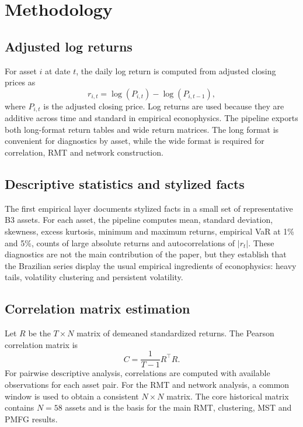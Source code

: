 \section{Methodology}
\label{sec:methodology}

\subsection{Adjusted log returns}

For asset $i$ at date $t$, the daily log return is computed from adjusted closing prices as
\begin{equation}
r_{i,t} = \log(P_{i,t}) - \log(P_{i,t-1}),
\end{equation}
where $P_{i,t}$ is the adjusted closing price. Log returns are used because they are additive across time and standard in empirical econophysics. The pipeline exports both long-format return tables and wide return matrices. The long format is convenient for diagnostics by asset, while the wide format is required for correlation, RMT and network construction.

\subsection{Descriptive statistics and stylized facts}

The first empirical layer documents stylized facts in a small set of representative B3 assets. For each asset, the pipeline computes mean, standard deviation, skewness, excess kurtosis, minimum and maximum returns, empirical VaR at 1\% and 5\%, counts of large absolute returns and autocorrelations of $|r_t|$. These diagnostics are not the main contribution of the paper, but they establish that the Brazilian series display the usual empirical ingredients of econophysics: heavy tails, volatility clustering and persistent volatility.

\subsection{Correlation matrix estimation}

Let $R$ be the $T \times N$ matrix of demeaned standardized returns. The Pearson correlation matrix is
\begin{equation}
C = \frac{1}{T-1} R^\top R.
\end{equation}
For pairwise descriptive analysis, correlations are computed with available observations for each asset pair. For the RMT and network analysis, a common window is used to obtain a consistent $N \times N$ matrix. The core historical matrix contains $N=58$ assets and is the basis for the main RMT, clustering, MST and PMFG results.


